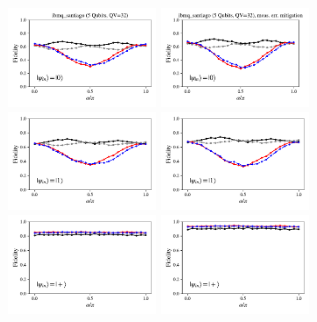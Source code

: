 \documentclass[a4paper]{article}
\begin{document}
\begin{figure}[H]
	\centering
	\includegraphics[width=0.35\textwidth]{fidelity_qc10_mit1_state0}
	\includegraphics[width=0.35\textwidth]{fidelity_qc10_mit0_state0}
	\\
	\includegraphics[width=0.35\textwidth]{fidelity_qc10_mit1_state1}
	\includegraphics[width=0.35\textwidth]{fidelity_qc10_mit0_state1}
	\\
	\includegraphics[width=0.35\textwidth]{fidelity_qc10_mit1_state2}
	\includegraphics[width=0.35\textwidth]{fidelity_qc10_mit0_state2}

\end{figure}
\end{document}
